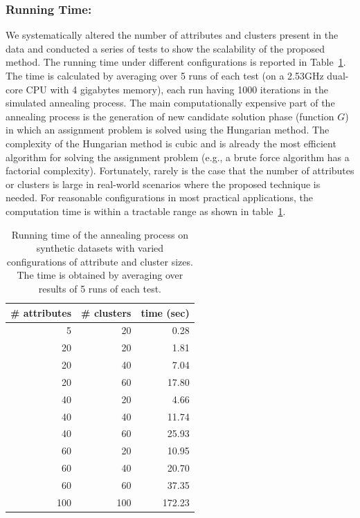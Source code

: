 \subsubsection{Running Time:}
We systematically altered the number of attributes and clusters present in the data and conducted a series of tests to show the scalability of the proposed method. The running time under different configurations is reported in Table~\ref{tbl:scale}. The time is calculated by averaging over 5 runs of each test (on a 2.53GHz dual-core CPU with 4 gigabytes memory), each run having 1000 iterations in the simulated annealing process. The main computationally expensive part of the annealing process is the generation of new candidate solution phase (function $G$) in which an assignment problem is solved using the Hungarian method. The complexity of the Hungarian method is cubic and is already the most efficient algorithm for solving the assignment problem (e.g., a brute force algorithm has a factorial complexity). Fortunately, rarely is the case that the number of attributes or clusters is large in real-world scenarios where the proposed technique is needed. For reasonable configurations in most practical applications, the computation time is within a tractable range as shown in table~\ref{tbl:scale}.
\begin{table}[tbh]
\begin{center}
\begin{tabular}{r|r|r}
\hline
\# attributes & \# clusters & time (sec)\\
\hline
5   &   20  &   0.28\\
20  &   20  &   1.81\\
20  &   40  &   7.04\\
20  &   60  &   17.80\\
40  &   20  &   4.66\\
40  &   40  &   11.74\\
40  &   60  &   25.93\\
60  &   20  &   10.95\\
60  &   40  &   20.70\\
60  &   60  &   37.35\\
100 &   100 &   172.23\\
\hline
\end{tabular}
\end{center}
\caption{\label{tbl:scale} Running time of the annealing process on synthetic datasets with varied configurations of attribute and cluster sizes. The time is obtained by averaging over results of 5 runs of each test.}
\end{table}

